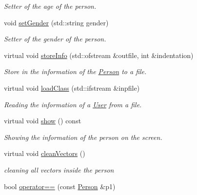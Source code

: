 \begin{DoxyCompactItemize}
\begin{DoxyCompactList}\small\item\em Setter of the age of the person. \end{DoxyCompactList}\item 
void \mbox{\hyperlink{class_person_a7625b600d2c9c0b9c9fc060a6906dac6}{set\+Gender}} (std\+::string gender)
\begin{DoxyCompactList}\small\item\em Setter of the gender of the person. \end{DoxyCompactList}\item 
virtual void \mbox{\hyperlink{class_person_a80f87df3f644706c2ad8fc8b800fdd95}{store\+Info}} (std\+::ofstream \&outfile, int \&indentation)
\begin{DoxyCompactList}\small\item\em Store in the information of the \mbox{\hyperlink{class_person}{Person}} to a file. \end{DoxyCompactList}\item 
virtual void \mbox{\hyperlink{class_person_af07a032df8d56dddade4dc43960b536b}{load\+Class}} (std\+::ifstream \&inpfile)
\begin{DoxyCompactList}\small\item\em Reading the information of a \mbox{\hyperlink{class_user}{User}} from a file. \end{DoxyCompactList}\item 
\mbox{\label{class_person_a0206a035f0e88297c8f1c09933dcc86f}} 
virtual void \mbox{\hyperlink{class_person_a0206a035f0e88297c8f1c09933dcc86f}{show}} () const
\begin{DoxyCompactList}\small\item\em Showing the information of the person on the screen. \end{DoxyCompactList}\item 
\mbox{\label{class_person_ae524672604b31635f981361d604bac7b}} 
virtual void \mbox{\hyperlink{class_person_ae524672604b31635f981361d604bac7b}{clean\+Vectors}} ()
\begin{DoxyCompactList}\small\item\em cleaning all vectors inside the person \end{DoxyCompactList}\item 
bool \mbox{\hyperlink{class_person_aa2fe338cbcf08ee5981dce811fd3a50a}{operator==}} (const \mbox{\hyperlink{class_person}{Person}} \&p1)

\end{DoxyCompactItemize}
